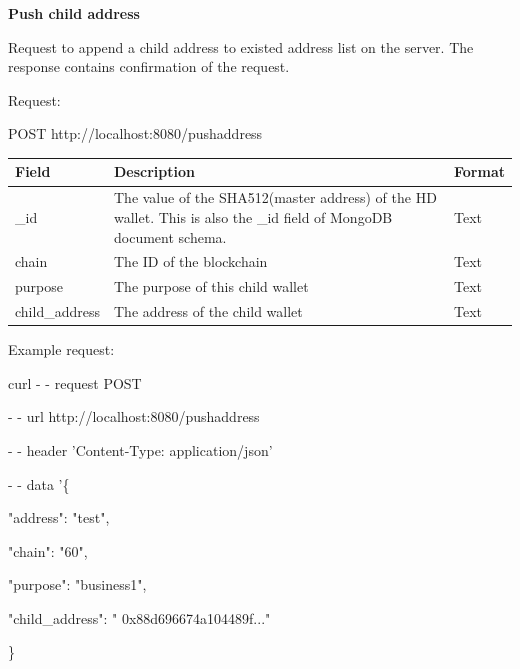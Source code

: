 \bigskip
{\textbf{Push child address}}
\bigskip

Request to append a child address to existed address list on the server. The response contains confirmation of the request.

Request:

\begin{framed}
    POST http://localhost:8080/pushaddress
\end{framed}

\begin{tabular}{| m{3cm} | m{9cm} | m{2.6cm} |}
    \hline
    Field & Description & Format                                            \\ \hline
    \_id & The value of the SHA512(master address) of the HD wallet. This is also the \_id field of MongoDB document schema.  & Text   \\ \hline
    chain   & The ID of the blockchain & Text    \\ \hline
    purpose   & The purpose of this child wallet & Text    \\ \hline
    child\_address   & The address of the child wallet & Text    \\ \hline
\end{tabular}
\bigskip

Example request:

\begin{framed}
\hspace*{13mm}    curl - - request POST \par
\hspace*{13mm}        - - url http://localhost:8080/pushaddress \par
\hspace*{13mm}        - - header 'Content-Type: application/json' \par
\hspace*{13mm}        - - data '\{ \par
\hspace*{27mm}                "address": "test",  \par
\hspace*{40mm}                "chain": "60", \par
\hspace*{40mm}                "purpose": "business1", \par
\hspace*{40mm}                "child\_address": " 0x88d696674a104489f..." \par
\hspace*{27mm}              \} \par
\end{framed}

